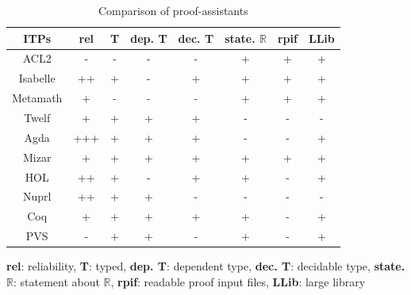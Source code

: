 \begin{table}[!ht]
 \centering
 \begin{threeparttable}
  \caption{Comparison of proof-assistants}\label{itpcom}\vspace*{-2mm}
  \begin{tabular}{|c|c|c|c|c|c|c|c|}
    \hline
    {\bf ITPs} & {\bf rel} & {\bf T} & {\bf dep. T} & {\bf dec. T}& {\bf state. $\mathbb{R}$} & {\bf rpif} & {\bf LLib} \\ \hline
     ACL2 & - & - & - & - & + & + & +\\ \hline
     Isabelle & ++ & + & - & + & + & + & + \\ \hline
     Metamath & + & - & - & - & + & + & + \\ \hline
     Twelf & + & + & + & + & - & - & - \\ \hline
     Agda & +++ & + & + & + & - & - & + \\ \hline
     Mizar & + & + & + & + & + & + & + \\ \hline
     HOL & ++ & + & - & + & + & - & + \\ \hline
     Nuprl & ++ & + & + & - & - & - & - \\ \hline
     Coq & + & + & + & + & + & - & +\\ \hline
     PVS & - & + & + & - & + & - & + \\ \hline    
     \end{tabular}
\begin{tablenotes}
 \item {\bf rel}: reliability, {\bf T}: typed, {\bf dep. T}: dependent type, {\bf dec. T}: decidable type, {\bf state. $\mathbb{R}$}: statement about $\mathbb{R}$, 
 {\bf rpif}: readable proof input files, {\bf LLib}: large library
\end{tablenotes}
\end{threeparttable}
\end{table}

